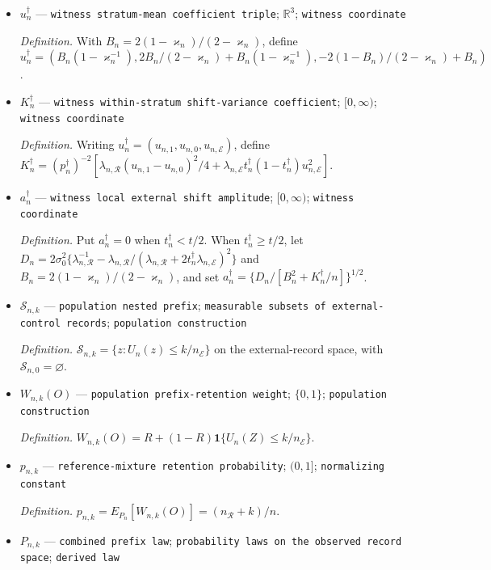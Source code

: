 \documentclass{article}
\begin{document}
\begin{itemize}
  \item \(u_n^{\dagger}\) --- \texttt{witness stratum-\allowbreak{}mean coefficient triple}; \(\mathbb R^3\); \texttt{witness coordinate}
  \par\smallskip\noindent\emph{Definition.} With \(B_n=2(1-\varkappa_n)/(2-\varkappa_n)\), define \(u_n^{\dagger}=(B_n(1-\varkappa_n^{-1}), 2B_n/(2-\varkappa_n)+B_n(1-\varkappa_n^{-1}), -2(1-B_n)/(2-\varkappa_n)+B_n)\).
  \item \(K_n^{\dagger}\) --- \texttt{witness within-\allowbreak{}stratum shift-\allowbreak{}variance coefficient}; \([0,\infty)\); \texttt{witness coordinate}
  \par\smallskip\noindent\emph{Definition.} Writing \(u_n^{\dagger}=(u_{n,1},u_{n,0},u_{n,\mathcal E})\), define \(K_n^{\dagger}=(p_n^{\dagger})^{-2}[\lambda_{n,\mathcal R}(u_{n,1}-u_{n,0})^2/4+\lambda_{n,\mathcal E}t_n^{\dagger}(1-t_n^{\dagger})u_{n,\mathcal E}^2]\).
  \item \(a_n^{\dagger}\) --- \texttt{witness local external shift amplitude}; \([0,\infty)\); \texttt{witness coordinate}
  \par\smallskip\noindent\emph{Definition.} Put \(a_n^{\dagger}=0\) when \(t_n^{\dagger}<t/2\).  When \(t_n^{\dagger}\geq t/2\), let \(D_n=2\sigma_0^2\{\lambda_{n,\mathcal R}^{-1}-\lambda_{n,\mathcal R}/(\lambda_{n,\mathcal R}+2t_n^{\dagger}\lambda_{n,\mathcal E})^2\}\) and \(B_n=2(1-\varkappa_n)/(2-\varkappa_n)\), and set \(a_n^{\dagger}=\{D_n/[B_n^2+K_n^{\dagger}/n]\}^{1/2}\).
  \item \(\mathcal S_{n,k}\) --- \texttt{population nested prefix}; \texttt{measurable subsets of external-\allowbreak{}control records}; \texttt{population construction}
  \par\smallskip\noindent\emph{Definition.} \(\mathcal S_{n,k}=\{z:U_n(z)\le k/n_{\mathcal E}\}\) on the external-record space, with \(\mathcal S_{n,0}=\varnothing\).
  \item \(W_{n,k}(O)\) --- \texttt{population prefix-\allowbreak{}retention weight}; \(\{0,1\}\); \texttt{population construction}
  \par\smallskip\noindent\emph{Definition.} \(W_{n,k}(O)=R+(1-R)\mathbf 1\{U_n(Z)\le k/n_{\mathcal E}\}\).
  \item \(p_{n,k}\) --- \texttt{reference-\allowbreak{}mixture retention probability}; \((0,1]\); \texttt{normalizing constant}
  \par\smallskip\noindent\emph{Definition.} \(p_{n,k}=E_{P_n}[W_{n,k}(O)]=(n_{\mathcal R}+k)/n\).
  \item \(P_{n,k}\) --- \texttt{combined prefix law}; \texttt{probability laws on the observed record space}; \texttt{derived law}

\end{itemize}
\end{document}
